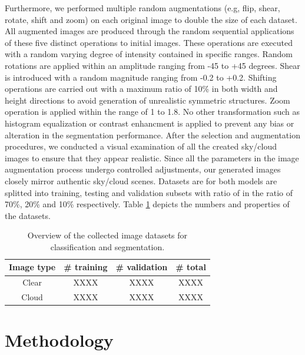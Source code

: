 \documentclass[amt, article]{copernicus}
\begin{document}
Furthermore, we performed multiple random augmentations (e.g, flip, shear, rotate, shift and zoom) on each original image to double the size of each dataset. All augmented images are produced through the random sequential applications of these five distinct operations to initial images.
These operations are executed with a random varying degree of intensity contained in specific ranges. Random rotations are applied within an amplitude ranging from -45 to +45 degrees. Shear is introduced with a random magnitude ranging from -0.2 to +0.2. Shifting operations are carried out with a maximum ratio of 10\% in both width and height directions to avoid generation of unrealistic symmetric structures. Zoom operation is applied within the range of 1 to 1.8. No other transformation such as histogram equalization or contrast enhancment is applied to prevent any bias or alteration in the segmentation performance. After the selection and augmentation procedures, we conducted a visual examination of all the created sky/cloud images to ensure that they appear realistic. Since all the parameters in the image augmentation process undergo controlled adjustments, our generated images closely mirror authentic sky/cloud scenes.
Datasets are for both models are splitted into training, testing and validation subsets with ratio of in the ratio of 70\%, 20\% and 10\% respectively. Table \ref{tab:dataset} depicts the numbers and properties of the datasets. 

\begin{table}[t]
\begin{center}
    \caption{Overview of the collected image datasets for classification and segmentation.}
    \begin{tabular}{c c c c} 
        \tophline
     Image type & \# training & \# validation & \# total \\ [1.0ex]
     \hline
     Clear & XXXX & XXXX & XXXX \\ [1.0ex]
     \hline
     Cloud & XXXX & XXXX & XXXX \\ [1.0ex]
     \hline
    \end{tabular}
    \belowtable{}
    \label{tab:dataset}
    \end{center}
    

\end{table}

\section{Methodology}
\label{sec:framework}
\end{document}
